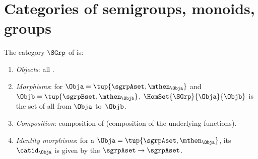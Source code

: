 
\section[Categories of semigroups, monoids, groups]{Categories of semigroups, monoids, groups}
\label{sec:cats-of-semigroups-monoids-groups}


\begin{ctdefinition}
    \label{def:SGrp}
    The category $\SGrp$ of  is:
    \begin{enumerate}
        \item \emph{Objects}: all .
        \item \emph{Morphisms}: for  $\Obja = \tup{\sgrpAset, \mthen_\Obja}$ and $\Objb = \tup{\sgrpBset, \mthen_\Objb}$,  $\HomSet{\SGrp}{\Obja}{\Objb}$ is the set of all  from $\Obja$ to~$\Objb$.
        \item \emph{Composition}: composition of  (composition of the underlying functions).
        \item \emph{Identity morphisms}: for a  $\Obja = \tup{\sgrpAset, \mthen_\Obja}$, its  $\catid_\Obja$ is given by the  $\sgrpAset \to \sgrpAset$.
    \end{enumerate}
\end{ctdefinition}

